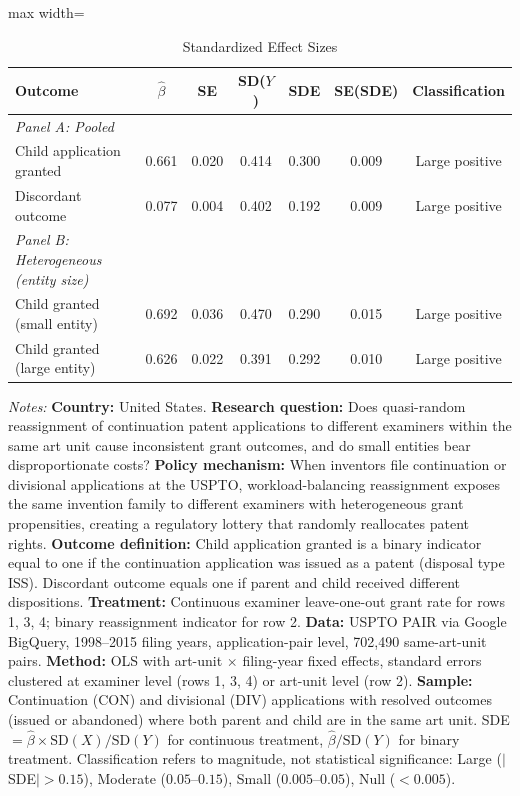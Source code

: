 \begin{table}[t]
\centering
\caption{Standardized Effect Sizes}
\label{tab:sde}
\begin{adjustbox}{max width=\textwidth}
\begin{tabular}{lcccccc}
\hline\hline
Outcome & $\hat{\beta}$ & SE & SD($Y$) & SDE & SE(SDE) & Classification \\
\hline
\textit{Panel A: Pooled} & & & & & & \\
Child application granted & 0.661 & 0.020 & 0.414 & 0.300 & 0.009 & Large positive \\
Discordant outcome & 0.077 & 0.004 & 0.402 & 0.192 & 0.009 & Large positive \\
\hline
\textit{Panel B: Heterogeneous (entity size)} & & & & & & \\
Child granted (small entity) & 0.692 & 0.036 & 0.470 & 0.290 & 0.015 & Large positive \\
Child granted (large entity) & 0.626 & 0.022 & 0.391 & 0.292 & 0.010 & Large positive \\
\hline\hline
\end{tabular}
\end{adjustbox}
\begin{tablenotes}[flushleft]
\small
\item \textit{Notes:} \textbf{Country:} United States. \textbf{Research question:} Does quasi-random reassignment of continuation patent applications to different examiners within the same art unit cause inconsistent grant outcomes, and do small entities bear disproportionate costs? \textbf{Policy mechanism:} When inventors file continuation or divisional applications at the USPTO, workload-balancing reassignment exposes the same invention family to different examiners with heterogeneous grant propensities, creating a regulatory lottery that randomly reallocates patent rights. \textbf{Outcome definition:} Child application granted is a binary indicator equal to one if the continuation application was issued as a patent (disposal type ISS). Discordant outcome equals one if parent and child received different dispositions. \textbf{Treatment:} Continuous examiner leave-one-out grant rate for rows 1, 3, 4; binary reassignment indicator for row 2. \textbf{Data:} USPTO PAIR via Google BigQuery, 1998--2015 filing years, application-pair level, 702,490 same-art-unit pairs. \textbf{Method:} OLS with art-unit $\times$ filing-year fixed effects, standard errors clustered at examiner level (rows 1, 3, 4) or art-unit level (row 2). \textbf{Sample:} Continuation (CON) and divisional (DIV) applications with resolved outcomes (issued or abandoned) where both parent and child are in the same art unit. SDE $= \hat{\beta} \times \text{SD}(X) / \text{SD}(Y)$ for continuous treatment, $\hat{\beta} / \text{SD}(Y)$ for binary treatment. Classification refers to magnitude, not statistical significance: Large ($|$SDE$| > 0.15$), Moderate ($0.05$--$0.15$), Small ($0.005$--$0.05$), Null ($< 0.005$).
\end{tablenotes}
\end{table}
